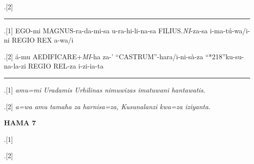 \begin{flushleft}
\ex.[2] \large {}\hspace{5pt}
\hspace{5pt}
\hspace{5pt}
\hspace{5pt}
\hspace{5pt}
\hspace{5pt} 


\hrule

	\ex.[1]  {EGO-mi}
{MAGNUS-ra-da-mi-sa}
{u-ra-hi-li-na-sa}
{FILIUS.\emph{NI}-za-sa}
{i-ma-tú-wa/i-ni REGIO}
{REX}
{a-wa/i}

\ex.[2]  {á-mu} {AEDIFICARE+\emph{MI}-ha} {za-'} {``CASTRUM''-hara/i-ni-sà-za}
 {``*218''ku-su-na-la-zi REGIO} {REL-za i-zi-ia-ta}


\hrule

\ex.[1] \emph{amu=mi Uradamis Urhilinas nimuwizas imatuwani hantawatis}.

\ex.[2] \emph{a=wa amu tamaha za harnisa=za, Kusunalanzi kwa=za iziyanta.}


\noindent \textbf{HAMA 7}

	\ex.[1] \large {}\hspace{5pt}
\hspace{5pt}
\hspace{5pt}
\hspace{5pt}
\hspace{5pt}
 \hspace{5pt}
 \hspace{5pt}
\hspace{5pt}
\hspace{5pt}

\ex.[2] \large {}\hspace{5pt}
\hspace{5pt}
\hspace{5pt}
\hspace{5pt}
\hspace{5pt}
\hspace{5pt}


\end{flushleft}
